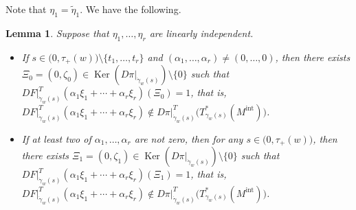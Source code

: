 \documentclass[a4paper,11pt,reqno]{amsart}
\numberwithin{equation}{section}
\newtheorem{lemma}[theorem]{Lemma}
\theoremstyle{definition}
\theoremstyle{remark}
\begin{document}
%
% 
Note that $\eta_1=\tilde{\eta}_1$. We have the following. 
%
%
\begin{lemma}
\label{theorem:propagation2}
Suppose that $\eta_1, \dotsc, \eta_r$ are linearly independent. 
%
%
\begin{itemize}
\item 
If $s \in \bigl(0,\tau_+(w)\bigr)\setminus\{t_1,\dotsc,t_r\}$ and 
$(\alpha_1,\dotsc,\alpha_r)\ne(0,\dotsc,0)$, then there exists 
$\Xi_0=(0,\zeta_0) \in \operatorname{Ker}(D\pi\vert_{\dot{\gamma}_w(s)})\setminus\{0\}$ 
such that 
$DF\vert^T_{\dot{\gamma}_w(s)}(\alpha_1\xi_1+\dotsb+\alpha_r\xi_r)(\Xi_0)=1$, that is, 
$DF\vert^T_{\dot{\gamma}_w(s)}(\alpha_1\xi_1+\dotsb+\alpha_r\xi_r) \not\in D\pi\vert_{\dot{\gamma}_w(s)}^T\bigl(T^\ast_{\gamma_w(s)}(M^\text{int})\bigr)$.
\item 
If at least two of $\alpha_1,\dotsc,\alpha_r$ are not zero, then for any $s \in \bigl(0,\tau_+(w)\bigr)$, 
then there exists 
$\Xi_1=(0,\zeta_1) \in \operatorname{Ker}(D\pi\vert_{\dot{\gamma}_w(s)})\setminus\{0\}$ 
such that 
$DF\vert^T_{\dot{\gamma}_w(s)}(\alpha_1\xi_1+\dotsb+\alpha_r\xi_r)(\Xi_1)=1$, that is, 
$DF\vert^T_{\dot{\gamma}_w(s)}(\alpha_1\xi_1+\dotsb+\alpha_r\xi_r) \not\in D\pi\vert_{\dot{\gamma}_w(s)}^T\bigl(T^\ast_{\gamma_w(s)}(M^\text{int})\bigr)$.
\end{itemize}
%
%
\end{lemma}
%
%
\end{document}
